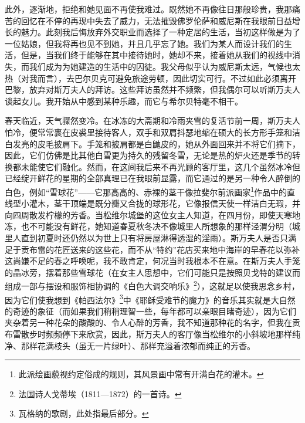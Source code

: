 \par 此外，逐渐地，拒绝和她见面不再使我难过。既然她不再像往日那般珍贵，我那痛苦的回忆在不停的再现中失去了威力，无法摧毁佛罗伦萨和威尼斯在我眼前日益增长的魅力。此刻我后悔放弃外交职业而选择了一种定居的生活，当初这样做是为了一位姑娘，但我将再也见不到她，并且几乎忘了她。我们为某人而设计我们的生活，但是，当我们终于能够在其中接待她时，她却不来，接着她从我们的视线中消失，而我们成为为她建造的生活中的囚徒。我父母似乎认为威尼斯太远，气候也太热（对我而言），去巴尔贝克可避免旅途劳顿，因此切实可行。不过如此必须离开巴黎，放弃对斯万夫人的拜访。这些拜访虽然并不频繁，但我偶尔可以听斯万夫人谈起女儿。我开始从中感到某种乐趣，而它与希尔贝特毫不相干。
\par 春天临近，天气骤然变冷。在冰冻的大斋期和冷雨夹雪的复活节前一周，斯万夫人怕冷，便常常裹在皮裘里接待客人，双手和双肩抖瑟地缩在硕大的长方形手笼和洁白发亮的皮毛披肩下。手笼和披肩都是白鼬皮的，她从外面回来并不将它们摘下，因此，它们仿佛是比其他白雪更为持久的残留冬雪，无论是热的炉火还是季节的转换都未能使它们融化。然而，在这间我后来不再光顾的客厅里，这几个虽然冰冷但已经绽开鲜花的星期的全部真理已在我眼前显露，而它通过的是另一种令人醉倒的白色，例如“雪球花”——它那高高的、赤裸的茎干像拉斐尔前派画家\footnote{此派绘画藐视约定俗成的规则，其风景画中常有开满白花的灌木。}作品中的直线型小灌木，茎干顶端是既分瓣又合拢的球形花，它像报信天使一样洁白无瑕，并向四周散发柠檬的芳香。当松维尔城堡的这位女主人知道，在四月份，即使天寒地冻，也不可能没有鲜花，她知道春夏秋冬决不像城里人所想象的那样泾渭分明（城里人直到初夏时还仍然以为世上只有将房屋淋得透湿的淫雨）。斯万夫人是否只满足于贡布雷的花匠送来的这些花，而不从“特约”花店买来地中海岸的早春花以弥补这尚嫌不足的春之呼唤呢，我不敢肯定，何况当时我根本不在意。在斯万夫人手笼的晶冰旁，摆着那些雪球花（在女主人思想中，它们可能只是按照贝戈特的建议而组成一部与摆设和服饰相协调的《白色大调交响乐》\footnote{法国诗人戈蒂埃（1811—1872）的一首诗。}），这就足以使我思念乡村，因为它们使我想到《帕西法尔》\footnote{瓦格纳的歌剧，此处指最后部分。}中《耶稣受难节的魔力》的音乐其实就是大自然的奇迹的象征（而如果我们稍稍理智一些，每年都可以亲眼目睹奇迹），因为它们夹杂着另一种花朵的酸酸的、令人心醉的芳香，我不知道那种花的名字，但我在贡布雷散步时频频停下来欣赏，因此，斯万夫人的客厅像当松维尔的小斜坡地那样纯净、那样花满枝头（虽无一片绿叶）、那样充溢着浓郁而纯正的芳香。
